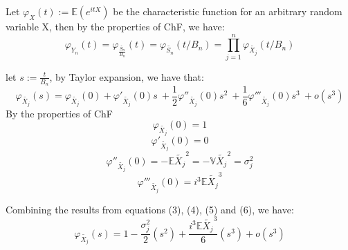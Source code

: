 \documentclass[]{article}
\begin{document}
Let $\varphi_X(t) := \mathbb{E}(e^{itX})$ be the characteristic function for an arbitrary random variable X, then by the properties of ChF, we have:
\begin{equation}
    \varphi_{Y_n} {(t)} = \varphi_{\frac{\tilde{S_n}}{B_n}} {(t)} = \varphi_{\tilde{S_n}}{(t/B_n)} = \prod_{j = 1}^n \varphi_{\tilde{X_j}}{(t/B_n)}
\end{equation}

let $s:= \frac{t}{B_n}$, by Taylor expansion, we have that:
\begin{equation}
    \varphi_{\tilde{X_j}}{(s)} = \varphi_{\tilde{X_j}}{(0)} + \varphi'_{\tilde{X_j}}{(0)} s\  + \frac{1}{2}\varphi''_{\tilde{X_j}}{(0)} s^2\ +\frac{1}{6} \varphi'''_{\tilde{X_j}}{(0)} s^3\ + o(s^3)
\end{equation}
\clearpage
By the properties of ChF
\begin{equation}
    \varphi_{\tilde{X_j}}{(0)} = 1
\end{equation}
\begin{equation}
     \varphi'_{\tilde{X_j}}{(0)} = 0
\end{equation}
\begin{equation}
     \varphi''_{\tilde{X_j}}{(0)} = -\mathbb{E} {\tilde{X_j}^2} = -\mathbb{V}{\tilde{X_j}^2} = \sigma_j^2
\end{equation}
\begin{equation}
     \varphi'''_{\tilde{X_j}}{(0)} = i^3 \mathbb{E} \tilde{X_j}^3
\end{equation}

Combining the results from equations (3), (4), (5) and (6), we have:
\begin{equation}
    \varphi_{\tilde{X_j}}{(s)} = 1 - \frac{\sigma_j^2}{2} (s^2) + \frac{i^3 \mathbb{E}{\tilde{X_j}^3}}{6} (s^3) + o(s^3)
\end{equation}
\end{document}

